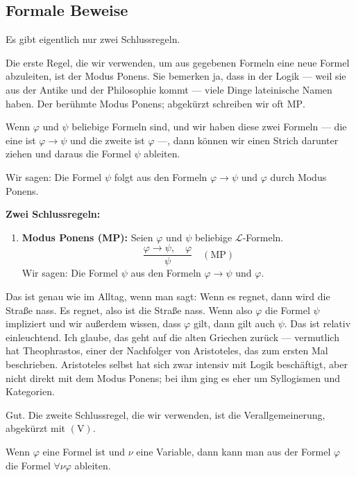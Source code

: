 \subsection{Formale Beweise}


\begin{spoken-clean}[00:11:47 - 00:13:40]
Es gibt eigentlich nur zwei Schlussregeln. 

Die erste Regel, die wir verwenden, um aus gegebenen Formeln eine neue Formel abzuleiten, ist der Modus Ponens. Sie bemerken ja, dass in der Logik --- weil sie aus der Antike und der Philosophie kommt --- viele Dinge lateinische Namen haben. Der berühmte Modus Ponens; abgekürzt schreiben wir oft $\text{MP}$. 

Wenn $\varphi$ und $\psi$ beliebige Formeln sind, und wir haben diese zwei Formeln --- die eine ist $\varphi \rightarrow \psi$ und die zweite ist $\varphi$ ---, dann können wir einen Strich darunter ziehen und daraus die Formel $\psi$ ableiten. 

Wir sagen: Die Formel $\psi$ folgt aus den Formeln $\varphi \rightarrow \psi$ und $\varphi$ durch Modus Ponens.
\end{spoken-clean}

\begin{math-stroke}
\textbf{Zwei Schlussregeln:}

\begin{enumerate}[label=\textbf{(\arabic*)}]
    \setcounter{enumi}{0} \item \textbf{Modus Ponens (MP):}
    Seien $\varphi$ und $\psi$ beliebige $\mathcal{L}$-Formeln.
    \[
    \frac{\varphi \rightarrow \psi, \quad \varphi}{\psi} \quad (\text{MP})
    \]
    Wir sagen: Die Formel $\psi$  aus den Formeln $\varphi \rightarrow \psi$ und $\varphi$.
\end{enumerate}
\end{math-stroke}

\begin{spoken-clean}[00:13:40 - 00:15:23]
Das ist genau wie im Alltag, wenn man sagt: Wenn es regnet, dann wird die Straße nass. Es regnet, also ist die Straße nass. Wenn also $\varphi$ die Formel $\psi$ impliziert und wir außerdem wissen, dass $\varphi$ gilt, dann gilt auch $\psi$. Das ist relativ einleuchtend. Ich glaube, das geht auf die alten Griechen zurück --- vermutlich hat Theophrastos, einer der Nachfolger von Aristoteles, das zum ersten Mal beschrieben. Aristoteles selbst hat sich zwar intensiv mit Logik beschäftigt, aber nicht direkt mit dem Modus Ponens; bei ihm ging es eher um Syllogismen und Kategorien. 

Gut. Die zweite Schlussregel, die wir verwenden, ist die Verallgemeinerung, abgekürzt mit $(\text{V})$. 

Wenn $\varphi$ eine Formel ist und $\nu$ eine Variable, dann kann man aus der Formel $\varphi$ die Formel $\forall \nu \varphi$ ableiten.
\end{spoken-clean}


